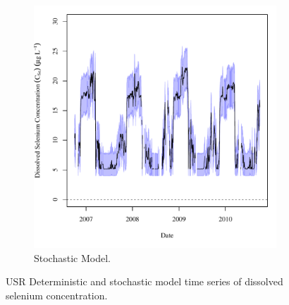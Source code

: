 \begin{linenumbers}
\begin{landscape}
\begin{figure}
\begin{subfigure}{0.7\textwidth}
			\includegraphics[width=\tableCustomSize]{"Figures/Results_USR/Stochastic/c TS TIM"}
			\caption{Stochastic Model.}
		\end{subfigure}
		\caption{USR Deterministic and stochastic model time series of dissolved selenium concentration.}
	\end{figure}
\end{landscape}




\end{linenumbers}

